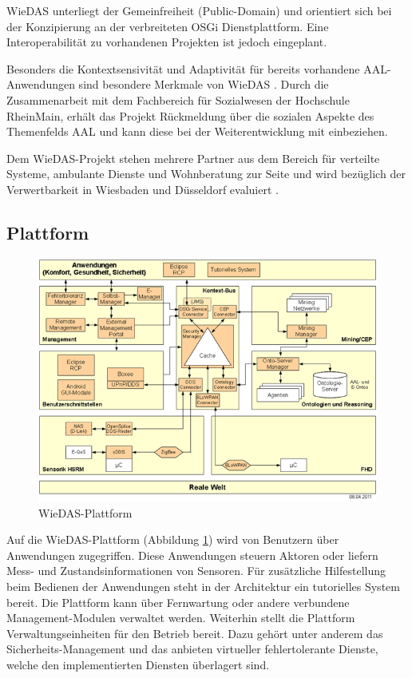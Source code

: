 WieDAS unterliegt der Gemeinfreiheit (Public-Domain) und orientiert sich bei der Konzipierung an der
verbreiteten OSGi Dienstplattform.
Eine Interoperabilität zu vorhandenen Projekten ist jedoch eingeplant.

Besonders die Kontextsensivität und Adaptivität für bereits vorhandene AAL-Anwendungen sind besondere
Merkmale von WieDAS \cite{wiedas}.
Durch die Zusammenarbeit mit dem Fachbereich für Sozialwesen der Hochschule RheinMain, erhält das Projekt
Rückmeldung über die sozialen Aspekte des Themenfelds AAL und kann diese bei der Weiterentwicklung mit
einbeziehen.

Dem WieDAS-Projekt stehen mehrere Partner aus dem Bereich für verteilte Systeme, ambulante Dienste und
Wohnberatung zur Seite und wird bezüglich der Verwertbarkeit in Wiesbaden und Düsseldorf evaluiert \cite[Partner]{wiedas}.

\subsection{Plattform}
\label{gru_wiedas_plattform}

\begin{figure}[h]
\includegraphics[scale=0.8]{images/wiedas_plattform}
\caption{WieDAS-Plattform}
\label{wiedas_plattform}
\end{figure}

Auf die WieDAS-Plattform (Abbildung \ref{wiedas_plattform}) wird von Benutzern über Anwendungen zugegriffen.
Diese Anwendungen steuern Aktoren oder liefern Mess- und Zustandsinformationen von Sensoren.
Für zusätzliche Hilfestellung beim Bedienen der Anwendungen steht in der Architektur ein
tutorielles System bereit.
Die Plattform kann über Fernwartung oder andere verbundene Management-Modulen verwaltet werden.
Weiterhin stellt die Plattform Verwaltungseinheiten für den Betrieb bereit.
Dazu gehört unter anderem das Sicherheits-Management und das anbieten virtueller fehlertolerante
Dienste, welche den implementierten Diensten überlagert sind.

